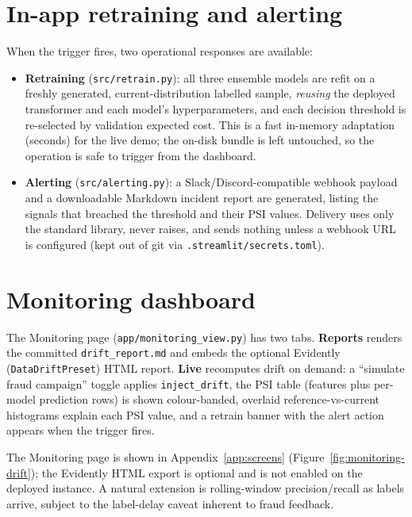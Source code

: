 \documentclass[11pt,a4paper]{report}
\newcommand{\code}[1]{\texttt{\small #1}}
\begin{document}
\section{In-app retraining and alerting}

When the trigger fires, two operational responses are available:

\begin{itemize}[nosep,leftmargin=1.4em]
  \item \textbf{Retraining} (\code{src/retrain.py}): all three ensemble models are refit on a
        freshly generated, current-distribution labelled sample, \emph{reusing} the deployed
        transformer and each model's hyperparameters, and each decision threshold is
        re-selected by validation expected cost. This is a fast in-memory adaptation (seconds)
        for the live demo; the on-disk bundle is left untouched, so the operation is safe to
        trigger from the dashboard.
  \item \textbf{Alerting} (\code{src/alerting.py}): a Slack/Discord-compatible webhook payload
        and a downloadable Markdown incident report are generated, listing the signals that
        breached the threshold and their PSI values. Delivery uses only the standard library,
        never raises, and sends nothing unless a webhook URL is configured (kept out of git
        via \code{.streamlit/secrets.toml}).
\end{itemize}

\section{Monitoring dashboard}

The Monitoring page (\code{app/monitoring\_view.py}) has two tabs. \textbf{Reports} renders
the committed \code{drift\_report.md} and embeds the optional Evidently
(\code{DataDriftPreset}) HTML report. \textbf{Live} recomputes drift on demand: a
``simulate fraud campaign'' toggle applies \code{inject\_drift}, the PSI table (features plus
per-model prediction rows) is shown colour-banded, overlaid reference-vs-current histograms
explain each PSI value, and a retrain banner with the alert action appears when the trigger
fires.

The Monitoring page is shown in Appendix~\ref{app:screens}
(Figure~\ref{fig:monitoring-drift}); the Evidently HTML export is optional and is not
enabled on the deployed instance. A natural extension is rolling-window precision/recall as
labels arrive, subject to the label-delay caveat inherent to fraud feedback.
\end{document}
